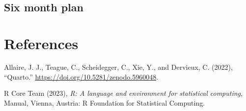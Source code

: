 \documentclass[
  letterpaper,
  DIV=11,
  numbers=noendperiod]{scrartcl}
\newlength{\cslhangindent}
\newenvironment{CSLReferences}[2] %
 {\begin{list}{}{%
  \setlength{\itemindent}{0pt}
  \setlength{\leftmargin}{0pt}
  \setlength{\parsep}{0pt}
  \ifodd #1
   \setlength{\leftmargin}{\cslhangindent}
   \setlength{\itemindent}{-1\cslhangindent}
  \fi
  \setlength{\itemsep}{#2\baselineskip}}}
 {\end{list}}
\begin{document}
\subsection{Six month plan}\label{six-month-plan}

\newpage{}

\section{References}\label{references}

\label{refs}
\begin{CSLReferences}{1}{0}
Allaire, J. J., Teague, C., Scheidegger, C., Xie, Y., and Dervieux, C.
(2022), {``{Quarto}.''} \url{https://doi.org/10.5281/zenodo.5960048}.

R Core Team (2023), \emph{R: A language and environment for statistical
computing}, Manual, Vienna, Austria: R Foundation for Statistical
Computing.

\end{CSLReferences}
\end{document}
